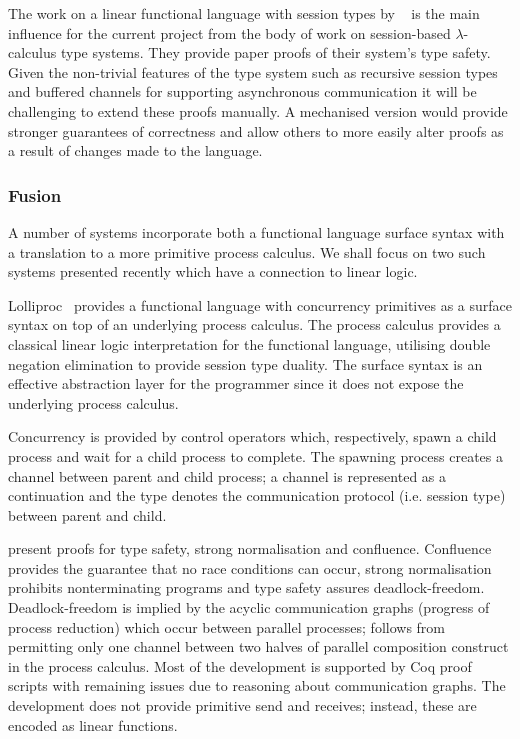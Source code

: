 \documentclass{mprop}
\newcommand{\1}{\textbf{1}\xspace}
\begin{document}
The work on a linear functional language with session types by
\citeauthor{Gay:2010:LAST}~\cite{Gay:2010:LAST} is the main influence for the
current project from the body of work on session-based $\lambda$-calculus type
systems. They provide paper proofs of their system's type safety. Given the
non-trivial features of the type system such as recursive session types and
buffered channels for supporting asynchronous communication it will be
challenging to extend these proofs manually. A mechanised version would
provide stronger guarantees of correctness and allow others to more easily
alter proofs as a result of changes made to the language.

\subsubsection{Fusion}

A number of systems incorporate both a functional language surface syntax with
a translation to a more primitive process calculus. We shall focus on two such
systems presented recently which have a connection to linear logic.

Lolliproc~\cite{Mazurak:2010:LCC} provides a functional language with
concurrency primitives as a surface syntax on top of an underlying process
calculus. The process calculus provides a classical linear logic
interpretation for the functional language, utilising double negation
elimination to provide session type duality. The surface syntax is an
effective abstraction layer for the programmer since it does not expose the
underlying process calculus.

Concurrency is provided by control operators which, respectively, spawn a
child process and wait for a child process to complete. The spawning process
creates a channel between parent and child process; a channel is represented
as a continuation and the type denotes the communication protocol
(i.e. session type) between parent and child.

\citeauthor{Mazurak:2010:LCC} present proofs for type safety, strong
normalisation and confluence. Confluence provides the guarantee that no race
conditions can occur, strong normalisation prohibits nonterminating programs
and type safety assures deadlock-freedom. Deadlock-freedom is implied by the
acyclic communication graphs (progress of process reduction) which occur
between parallel processes; follows from permitting only one channel between
two halves of parallel composition construct in the process calculus. Most of
the development is supported by Coq proof scripts with remaining issues due to
reasoning about communication graphs. The development does not provide
primitive send and receives; instead, these are encoded as linear functions.
\end{document}
